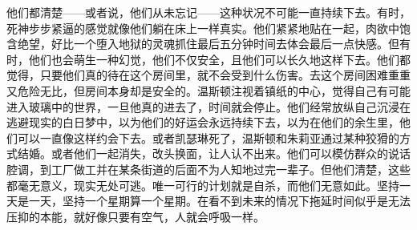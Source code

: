 \begin{paracol}{2}
\switchcolumn

他们都清楚——或者说，他们从未忘记——这种状况不可能一直持续下去。有时，死神步步紧逼的感觉就像他们躺在床上一样真实。他们紧紧地贴在一起，肉欲中饱含绝望，好比一个堕入地狱的灵魂抓住最后五分钟时间去体会最后一点快感。但有时，他们也会萌生一种幻觉，他们不仅安全，且他们可以长久地这样下去。他们都觉得，只要他们真的待在这个房间里，就不会受到什么伤害。去这个房间困难重重又危险无比，但房间本身却是安全的。温斯顿注视着镇纸的中心，觉得自己有可能进入玻璃中的世界，一旦他真的进去了，时间就会停止。他们经常放纵自己沉浸在逃避现实的白日梦中，以为他们的好运会永远持续下去，以为在他们的余生里，他们可以一直像这样约会下去。或者凯瑟琳死了，温斯顿和朱莉亚通过某种狡猾的方式结婚。或者他们一起消失，改头换面，让人认不出来。他们可以模仿群众的说话腔调，到工厂做工并在某条街道的后面不为人知地过完一辈子。但他们清楚，这些都毫无意义，现实无处可逃。唯一可行的计划就是自杀，而他们无意如此。坚持一天是一天，坚持一个星期算一个星期。在看不到未来的情况下拖延时间似乎是无法压抑的本能，就好像只要有空气，人就会呼吸一样。

\switchcolumn*


\end{paracol}
